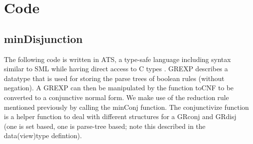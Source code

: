 \documentclass[phd,tocprelim]{cornell}
\begin{document}
\section{Code}
\subsection{minDisjunction}

The following code is written in ATS, a type-safe language including syntax similar to SML while
having direct access to C types \cite{ATStypes03}.
GREXP describes a datatype that is used for storing the parse trees of boolean rules (without negation).
A GREXP can then be manipulated by the function toCNF to be converted to a conjunctive normal form.
We make use of the reduction rule mentioned previously by calling the minConj function. The 
conjunctivize function is a helper function to deal with different structures for a GRconj
and GRdisj (one is set based, one is parse-tree based; note this described in the data(view)type defintion).
\end{document}
